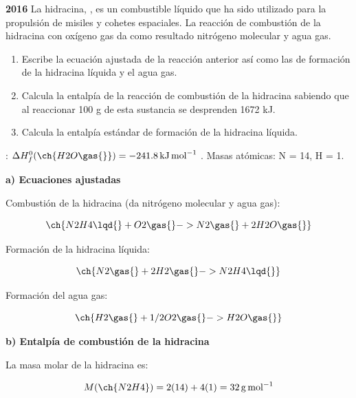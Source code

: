 \begin{exerciseEVAU}
    \textbf{2016} La hidracina, , es un combustible líquido que ha sido utilizado para la propulsión de misiles y cohetes espaciales. La reacción de combustión de la hidracina con oxígeno gas da como resultado nitrógeno
    molecular y agua gas.
    \begin{enumerate}[label=\letraminuscula]
    \item  Escribe la ecuación ajustada de la reacción anterior así como las de formación de la hidracina
    líquida y el agua gas.
    \item Calcula la entalpía de la reacción de combustión de la hidracina sabiendo que al reaccionar
    100 g de esta sustancia se desprenden 1672 kJ.
    \item Calcula la entalpía estándar de formación de la hidracina líquida.
    \end{enumerate}
    \datos{}: \(\Delta H^0_f (\ch{H2O \gas{}}) = \energia[kjmol]{-241.8}\). Masas atómicas: N = 14, H = 1.
    \begin{solu}

        \textbf{a) Ecuaciones ajustadas}

        Combustión de la hidracina (da nitrógeno molecular y agua gas):

        \begin{equation*}
            \ch{N2H4 \lqd{} + O2 \gas{} -> N2 \gas{} + 2 H2O \gas{}}
        \end{equation*}

        Formación de la hidracina líquida:

        \begin{equation*}
            \ch{N2 \gas{} + 2 H2 \gas{} -> N2H4 \lqd{}}
        \end{equation*}

        Formación del agua gas:

        \begin{equation*}
            \ch{H2 \gas{} + 1/2 O2 \gas{} -> H2O \gas{}}
        \end{equation*}

        \textbf{b) Entalpía de combustión de la hidracina}

        La masa molar de la hidracina es:

        \begin{equation*}
            M(\ch{N2H4}) = 2(14) + 4(1) = \SI{32}{\gram\per\mole}
        \end{equation*}


\end{solu}
\end{exerciseEVAU}
